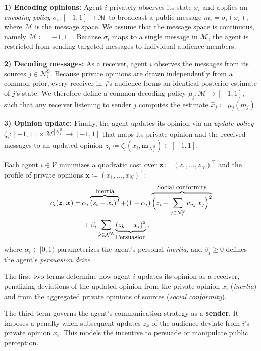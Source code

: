 \documentclass[journal,twoside,web]{ieeecolor}
\begin{document}
\textbf{1) Encoding opinions:} Agent $i$ privately observes its state $x_i$ and applies an \emph{encoding policy} $\sigma_i : [-1, 1] \to \mathcal{M}$ to broadcast a public message $m_i = \sigma_i(x_i)$, where $\mathcal{M}$ is the message space. We assume that the message space is continuous, namely $\mathcal{M} \coloneqq [-1,1]$. Because $\sigma_i$ maps to a single message in $\mathcal{M}$, the agent is restricted from sending targeted messages to individual audience members.

\textbf{2) Decoding messages:} As a receiver, agent $i$ observes the messages from its sources $j \in \mathcal{N}_i^{\mathrm{S}}$. Because private opinions are drawn independently from a common prior, every receiver in $j$'s audience forms an identical posterior estimate of $j$'s state. We therefore define a common decoding policy $\mu_j: \mathcal{M} \to [-1,1]$, such that any receiver listening to sender $j$ computes the estimate $\widehat{x}_j \coloneqq \mu_j(m_j)$.

\textbf{3) Opinion update:} Finally, the agent updates its opinion via an \emph{update policy} $\zeta_i : [-1, 1] \times \mathcal{M}^{|\mathcal{N}_i^{\mathrm{S}}|} \to [-1,1]$ that maps its private opinion and the received messages to an updated opinion $z_i \coloneqq \zeta_i(x_i, \bm{m}_{\mathcal{N}_i^{\mathrm{S}}}) \in [-1,1]$.

Each agent $i \in \mathcal{V}$ minimizes a quadratic cost over $\bm{z} \coloneqq (z_1, \dots, z_N)^\top$ and the profile of private opinions $\bm{x}\coloneqq(x_1, \dots, x_N)^\top$:
\begin{align}
    \label{eq:cost_i}
    c_i(\bm{z},\bm{x}) =\, & \alpha_i\overbrace{(z_i-x_i)^2}^{\text{\small Inertia}} + (1-\alpha_i)\overbrace{\Big(z_i-\sum_{j \in \mathcal{N}_i^{\mathrm{S}}} w_{ij}\,x_j \Big)^2}^{\text{\small Social conformity}} \nonumber \\
                           & +\beta_i \sum_{k \in \mathcal{N}_i^{\mathrm{A}}}\underbrace{{(z_k-x_i)^2}}_{\text{\small Persuasion}}\,,
\end{align}
where $\alpha_i \in [0,1)$ parameterizes the agent's personal \emph{inertia}, and $\beta_i \geq 0$ defines the agent's \emph{persuasion drive}.

The first two terms determine how agent $i$ updates its opinion as a receiver, penalizing deviations of the updated opinion from the private opinion $x_i$ (\emph{inertia}) and from the aggregated private opinions of sources (\emph{social conformity}).

The third term governs the agent's communication strategy as a \textbf{sender}. It imposes a penalty when subsequent updates $z_k$ of the audience deviate from $i$'s private opinion $x_i$. This models the incentive to persuade or manipulate public perception.
\end{document}

